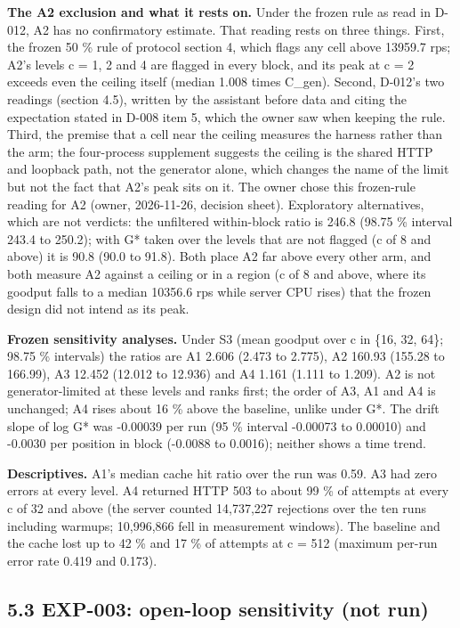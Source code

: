 \documentclass[
]{article}
\begin{document}
\textbf{The A2 exclusion and what it rests on.} Under the frozen rule as
read in D-012, A2 has no confirmatory estimate. That reading rests on
three things. First, the frozen 50 \% rule of protocol section 4, which
flags any cell above 13959.7 rps; A2's levels c = 1, 2 and 4 are flagged
in every block, and its peak at c = 2 exceeds even the ceiling itself
(median 1.008 times C\_gen). Second, D-012's two readings (section 4.5),
written by the assistant before data and citing the expectation stated
in D-008 item 5, which the owner saw when keeping the rule. Third, the
premise that a cell near the ceiling measures the harness rather than
the arm; the four-process supplement suggests the ceiling is the shared
HTTP and loopback path, not the generator alone, which changes the name
of the limit but not the fact that A2's peak sits on it. The owner chose
this frozen-rule reading for A2 (owner, 2026-11-26, decision sheet).
Exploratory alternatives, which are not verdicts: the unfiltered
within-block ratio is 246.8 (98.75 \% interval 243.4 to 250.2); with G*
taken over the levels that are not flagged (c of 8 and above) it is 90.8
(90.0 to 91.8). Both place A2 far above every other arm, and both
measure A2 against a ceiling or in a region (c of 8 and above, where its
goodput falls to a median 10356.6 rps while server CPU rises) that the
frozen design did not intend as its peak.

\textbf{Frozen sensitivity analyses.} Under S3 (mean goodput over c in
\{16, 32, 64\}; 98.75 \% intervals) the ratios are A1 2.606 (2.473 to
2.775), A2 160.93 (155.28 to 166.99), A3 12.452 (12.012 to 12.936) and
A4 1.161 (1.111 to 1.209). A2 is not generator-limited at these levels
and ranks first; the order of A3, A1 and A4 is unchanged; A4 rises about
16 \% above the baseline, unlike under G*. The drift slope of log G* was
-0.00039 per run (95 \% interval -0.00073 to 0.00010) and -0.0030 per
position in block (-0.0088 to 0.0016); neither shows a time trend.

\textbf{Descriptives.} A1's median cache hit ratio over the run was
0.59. A3 had zero errors at every level. A4 returned HTTP 503 to about
99 \% of attempts at every c of 32 and above (the server counted
14,737,227 rejections over the ten runs including warmups; 10,996,866
fell in measurement windows). The baseline and the cache lost up to 42
\% and 17 \% of attempts at c = 512 (maximum per-run error rate 0.419
and 0.173).

\subsection{5.3 EXP-003: open-loop sensitivity (not
run)}\label{exp-003-open-loop-sensitivity-not-run}
\end{document}
